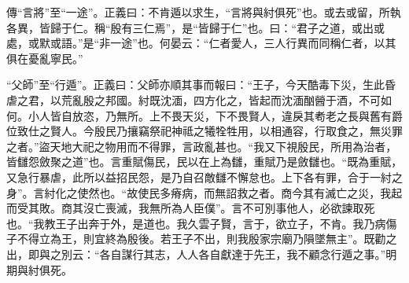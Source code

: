 {\noindent\zhuan{}\fzbyks 傳“言將”至“一途”。正義曰：不肯遁以求生，“言將與紂俱死”也。或去或留，所執各異，皆歸于仁。稱“殷有三仁焉”，是“皆歸于仁”也。曰：“君子之道，或出或處，或默或語。”是“非一途”也。何晏云：“仁者愛人，三人行異而同稱仁者，以其俱在憂亂寧民。” \par}

{\noindent\shu{}\fzkt “父師”至“行遁”。正義曰：父師亦順其事而報曰：“王子，今天酷毒下災，生此昏虐之君，以荒亂殷之邦國。紂既沈湎，四方化之，皆起而沈湎酗醟于酒，不可如何。小人皆自放恣，乃無所。上不畏天災，下不畏賢人，違戾其耇老之長與舊有爵位致仕之賢人。今殷民乃攘竊祭祀神祗之犧牷牲用，以相通容，行取食之，無災罪之者。”盜天地大祀之物用而不得罪，言政亂甚也。“我又下視殷民，所用為治者，皆讎怨斂聚之道”也。言重賦傷民，民以在上為讎，重賦乃是斂讎也。“既為重賦，又急行暴虐，此所以益招民怨，是乃自召敵讎不懈怠也。上下各有罪，合于一紂之身”。言紂化之使然也。“故使民多瘠病，而無詔救之者。商今其有滅亡之災，我起而受其敗。商其沒亡喪滅，我無所為人臣僕”。言不可別事他人，必欲諫取死也。“我教王子出奔于外，是道也。我久雲子賢，言于，欲立子，不肯。我乃病傷子不得立為王，則宜終為殷後。若王子不出，則我殷家宗廟乃隕墜無主”。既勸之出，即與之別云：“各自謀行其志，人人各自獻達于先王，我不顧念行遁之事。”明期與紂俱死。 \par}

